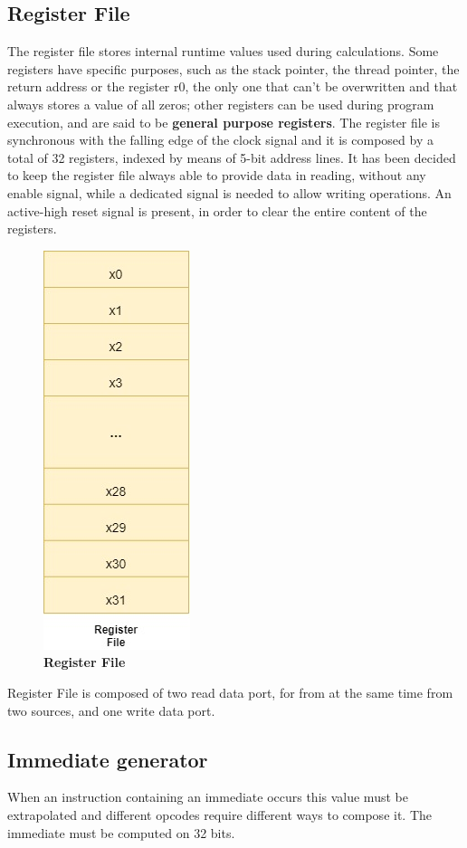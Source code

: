 \subsection{Register File}

The register file stores internal runtime values used during calculations.
Some registers have specific purposes, such as the stack pointer, the thread pointer, the return address or the register r0, the only one that can't be overwritten 
and that always stores a value of all zeros; other registers can be used during program execution, and are said to be \textbf{general purpose registers}.
The register file is synchronous with the falling edge of the clock signal and it is composed by a total of 32 registers, indexed by means of 5-bit address lines.
It has been decided to keep the register file always able to provide data in reading, without any enable signal, while a dedicated signal is needed to allow writing operations.
An active-high reset signal is present, in order to clear the entire content of the registers.

\begin{figure}[!h]
    \centering
        \includegraphics[width=0.2\linewidth]{schematic/RegisterFile.jpg}
        \caption{\textbf{Register File}}
\end{figure}
    
Register File is composed of two read data port, for from at the same time from two sources, and one write data port.

\clearpage

\subsection{Immediate generator}

When an instruction containing an immediate occurs this value must be extrapolated and different opcodes require 
different ways to compose it. The immediate must be computed on 32 bits.

